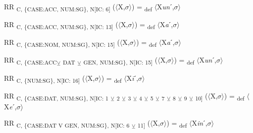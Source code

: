 {\begin{exe}
 RR \textsubscript{C, \{CASE:ACC, NUM:SG\}, N[IC: 6]} ($\langle$X,$\sigma $$\rangle$) = \textsubscript{def} $\langle$X\textit{un}ˊ,$\sigma $$\rangle$
\end{exe}

\begin{exe}
 RR \textsubscript{C, \{CASE:ACC, NUM:SG\}, N[IC: 13]} ($\langle$X,$\sigma $$\rangle$) = \textsubscript{def} $\langle$X\textit{a}ˊ,$\sigma $$\rangle$
\end{exe}

\begin{exe}
 RR \textsubscript{C, \{CASE:NOM, NUM:SG\}, N[IC: 15]} ($\langle$X,$\sigma $$\rangle$) = \textsubscript{def} $\langle$X\textit{a}ˊ,$\sigma $$\rangle$
\end{exe}

\begin{exe}
 RR \textsubscript{C, \{CASE:ACC}\textsubscript{${\veebar}$}\textsubscript{ DAT} \textsubscript{${\veebar}$}\textsubscript{ GEN, NUM:SG\}, N[IC: 15]} ($\langle$X,$\sigma $$\rangle$) = \textsubscript{def} $\langle$X\textit{un}ˊ,$\sigma $$\rangle$
\end{exe}

\begin{exe}
 RR \textsubscript{C, \{NUM:SG\}, N[IC: 16]} ($\langle$X,$\sigma $$\rangle$) = \textsubscript{def} $\langle$X\textit{\=i}ˊ,$\sigma $$\rangle$
\end{exe}

\begin{exe}
 RR \textsubscript{C, \{CASE:DAT, NUM:SG\}, N[IC: 1} \textsubscript{${\veebar}$}\textsubscript{ 2} \textsubscript{${\veebar}$}\textsubscript{ 3} \textsubscript{${\veebar}$}\textsubscript{ 4} \textsubscript{${\veebar}$}\textsubscript{ 5} \textsubscript{${\veebar}$}\textsubscript{ 7} \textsubscript{${\veebar}$}\textsubscript{ 8} \textsubscript{${\veebar}$}\textsubscript{ 9} \textsubscript{${\veebar}$}\textsubscript{ 10]} ($\langle$X,$\sigma $$\rangle$) = \textsubscript{def} $\langle$X\textit{e}ˊ,$\sigma $$\rangle$
\end{exe}

\begin{exe}
 RR \textsubscript{C, \{CASE:DAT V GEN, NUM:SG\}, N[IC: 6} \textsubscript{${\veebar}$}\textsubscript{ 11]} ($\langle$X,$\sigma $$\rangle$) = \textsubscript{def} $\langle$X\textit{in}ˊ,$\sigma $$\rangle$
\end{exe}

}
